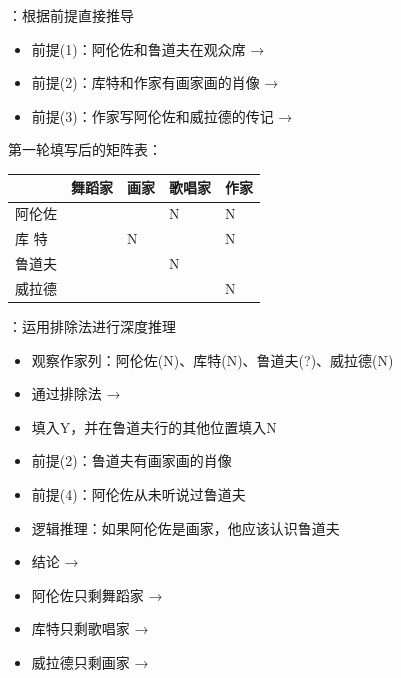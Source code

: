 ：根据前提直接推导
\begin{itemize}
  \item 前提(1)：阿伦佐和鲁道夫在观众席 → 
  \item 前提(2)：库特和作家有画家画的肖像 → 
  \item 前提(3)：作家写阿伦佐和威拉德的传记 → 
\end{itemize}

第一轮填写后的矩阵表：

\begin{center}
\begin{tabular}{|l|l|l|l|l|}
\hline
 & 舞蹈家 & 画家 & 歌唱家 & 作家 \\
\hline
阿伦佐 &  &  & N & N \\
\hline
库 特 &  & N &  & N \\
\hline
鲁道夫 &  &  & N &  \\
\hline
威拉德 &  &  &  & N \\
\hline
\end{tabular}
\end{center}

：运用排除法进行深度推理

\begin{theorembox}[title=关键推理步骤]
\begin{itemize}
  \item 观察作家列：阿伦佐(N)、库特(N)、鲁道夫(?)、威拉德(N)
  \item 通过排除法 → 
  \item 填入Y，并在鲁道夫行的其他位置填入N
\end{itemize}

\begin{itemize}
  \item 前提(2)：鲁道夫有画家画的肖像
  \item 前提(4)：阿伦佐从未听说过鲁道夫
  \item 逻辑推理：如果阿伦佐是画家，他应该认识鲁道夫
  \item 结论 → 
\end{itemize}

\begin{itemize}
  \item 阿伦佐只剩舞蹈家 → 
  \item 库特只剩歌唱家 → 
  \item 威拉德只剩画家 → 
\end{itemize}
\end{theorembox}

